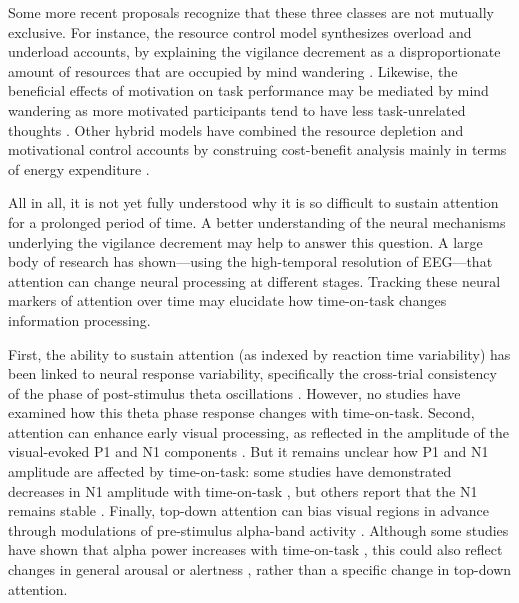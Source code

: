 \documentclass[11pt,english,]{memoir}
\begin{document}
Some more recent proposals recognize that these three classes are not mutually exclusive. For instance, the resource control model synthesizes overload and underload accounts, by explaining the vigilance decrement as a disproportionate amount of resources that are occupied by mind wandering \autocite{Thomson2015}. Likewise, the beneficial effects of motivation on task performance may be mediated by mind wandering \autocite{Mrazek2012} as more motivated participants tend to have less task-unrelated thoughts \autocites{Seli2015}{Seli2017}. Other hybrid models have combined the resource depletion and motivational control accounts by construing cost-benefit analysis mainly in terms of energy expenditure \autocites{Boksem2008}{Christie2015}.

All in all, it is not yet fully understood why it is so difficult to sustain attention for a prolonged period of time. A better understanding of the neural mechanisms underlying the vigilance decrement may help to answer this question. A large body of research has shown---using the high-temporal resolution of EEG---that attention can change neural processing at different stages. Tracking these neural markers of attention over time may elucidate how time-on-task changes information processing.

First, the ability to sustain attention (as indexed by reaction time variability) has been linked to neural response variability, specifically the cross-trial consistency of the phase of post-stimulus theta oscillations \autocite{Lutz2009}. However, no studies have examined how this theta phase response changes with time-on-task. Second, attention can enhance early visual processing, as reflected in the amplitude of the visual-evoked P1 and N1 components \autocites{Eason1969}{Luck1994}{Mangun1991}. But it remains unclear how P1 and N1 amplitude are affected by time-on-task: some studies have demonstrated decreases in N1 amplitude with time-on-task \autocites{Boksem2005}{Faber2012}, but others report that the N1 remains stable \autocites{Koelega1992}{Bonnefond2010}. Finally, top-down attention can bias visual regions in advance through modulations of pre-stimulus alpha-band activity \autocites{OConnell2009}{Mazaheri2014}. Although some studies have shown that alpha power increases with time-on-task \autocites{Boksem2005}{Bonnefond2010}{Bonnefond2011}, this could also reflect changes in general arousal or alertness \autocites{Cajochen1995}{Drapeau2004}, rather than a specific change in top-down attention.
\end{document}
